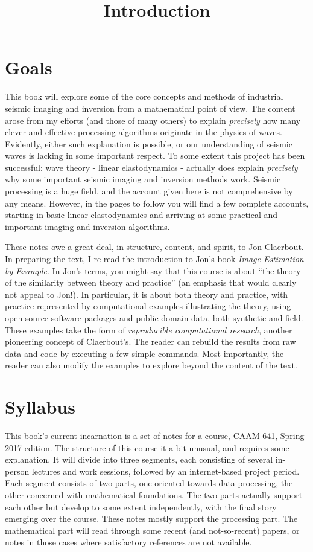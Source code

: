 \title{Introduction}

\section{Goals}
This book will explore some of the core concepts and methods of industrial seismic imaging and inversion from a mathematical point of view. The content arose from my efforts (and those of many others) to explain {\em precisely} how many clever and effective processing algorithms originate in the physics of waves. Evidently, either such explanation is possible, or our understanding of seismic waves is lacking in some important respect. To some extent this project has been successful: wave theory - linear elastodynamics -  actually does explain {\em precisely} why some important seismic imaging and inversion methods work. Seismic processing is a huge field, and the account given here is not comprehensive by any means. However, in the pages to follow you will find a few complete accounts, starting in basic linear elastodynamics and arriving at some practical and important imaging and inversion algorithms.  

These notes owe a great deal, in structure, content, and spirit, to Jon Claerbout. In preparing the text, I re-read the introduction to Jon's book {\em Image Estimation by Example}. In Jon's terms, you might say that this course is about ``the theory of the similarity between theory and practice'' (an emphasis that would clearly not appeal to Jon!). In particular, it is about both theory and practice, with practice represented by computational examples illustrating the theory, using open source software packages and public domain data, both synthetic and field. These examples take the form of {\em reproducible computational research}, another pioneering concept of Claerbout's. The reader can rebuild the results from raw data and code by executing a few simple commands. Most importantly, the reader can also modify the examples to explore beyond the content of the text.

\section{Syllabus}
This book's current incarnation is a set of notes for a course, CAAM 641, Spring 2017 edition. The structure of this course it a bit unusual, and requires some explanation. It will divide into three segments, each consisting of several in-person lectures and work sessions, followed by an internet-based project period. Each segment consists of two parts, one oriented towards data processing, the other concerned with mathematical foundations. The two parts actually support each other but develop to some extent independently, with the final story emerging over the course. These notes mostly support the processing part. The mathematical part will read through some recent (and not-so-recent) papers, or notes in those cases where satisfactory references are not available. 

